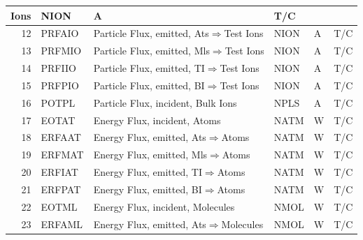 \begin{landscape}
\begin{longtable}{|r|l|l|l|l|c|}
    Ions                   & NION
			   & \si{\ampere}   & T/C
    \\    \hline
    12                     & PRFAIO         & Particle Flux, emitted,
    \ac{Ats}$\Rightarrow$Test Ions & NION           & \si{\ampere}                    & T/C
    \\
    \hline
    13                     & PRFMIO         & Particle Flux, emitted,
    \ac{Mls}$\Rightarrow$Test Ions & NION           & \si{\ampere}                    & T/C
    \\
    \hline
    14                     & PRFIIO         & Particle Flux, emitted,
    \ac{TI}$\Rightarrow$Test Ions & NION           & \si{\ampere}                    & T/C
    \\
    \hline
    15                     & PRFPIO         & Particle Flux, emitted,
    \ac{BI}$\Rightarrow$Test Ions & NION           & \si{\ampere}                    & T/C
    \\
    \hline
    16                     & POTPL          & Particle Flux, incident, Bulk
    Ions                   & NPLS
			   & \si{\ampere}   & T/C
    \\    \hline
    17                     & EOTAT          & Energy Flux, incident, Atoms
			   & NATM
			   & \si{\watt}     & T/C
    \\   \hline
    18                     & ERFAAT         & Energy Flux, emitted,
    \ac{Ats}$\Rightarrow$Atoms     & NATM           & \si{\watt}                      & T/C
    \\
    \hline
    19                     & ERFMAT         & Energy Flux, emitted,
    \ac{Mls}$\Rightarrow$Atoms     & NATM           & \si{\watt}                      & T/C
    \\
    \hline
    20                     & ERFIAT         & Energy Flux, emitted,
    \ac{TI}$\Rightarrow$Atoms     & NATM           & \si{\watt}                      & T/C
    \\
    \hline
    21                     & ERFPAT         & Energy Flux, emitted,
    \ac{BI}$\Rightarrow$Atoms     & NATM           & \si{\watt}                      & T/C
    \\
    \hline
    22                     & EOTML          & Energy Flux, incident,
    Molecules              & NMOL
			   & \si{\watt}     & T/C
    \\    \hline
    23                     & ERFAML         & Energy Flux, emitted,
    \ac{Ats}$\Rightarrow$Molecules & NMOL           & \si{\watt}                      & T/C
    \\

\end{longtable}
\end{landscape}
